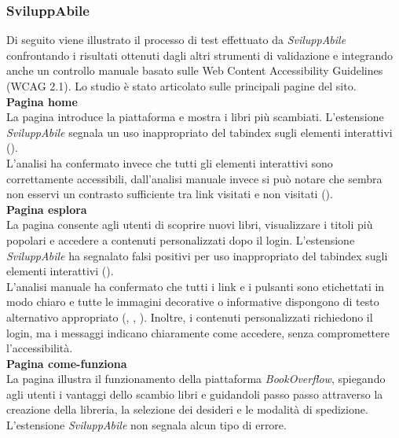 \subsubsection{SviluppAbile}
\noindent Di seguito viene illustrato il processo di test effettuato da \textit{SviluppAbile} confrontando i risultati ottenuti dagli altri strumenti di validazione e integrando anche un controllo manuale basato sulle Web Content Accessibility Guidelines (WCAG 2.1). Lo studio è stato articolato sulle principali pagine del sito.\\

\noindent \textbf{Pagina home}\\
La pagina introduce la piattaforma e mostra i libri più scambiati. 
L’estensione \textit{SviluppAbile} segnala un uso inappropriato del tabindex sugli elementi interattivi ({}).\\
L’analisi ha confermato invece che tutti gli elementi interattivi sono correttamente accessibili, dall'analisi manuale invece si può notare che sembra non esservi un contrasto sufficiente tra link visitati e non visitati ({}).\\

\noindent \textbf{Pagina esplora}\\
La pagina consente agli utenti di scoprire nuovi libri, visualizzare i titoli più popolari e accedere a contenuti personalizzati dopo il login. 
L’estensione \textit{SviluppAbile} ha segnalato falsi positivi per uso inappropriato del tabindex sugli elementi interattivi ({}).\\
L’analisi manuale ha confermato che tutti i link e i pulsanti sono etichettati in modo chiaro e tutte le immagini decorative o informative dispongono di testo alternativo appropriato ({}, {}, {}). Inoltre, i contenuti personalizzati richiedono il login, ma i messaggi indicano chiaramente come accedere, senza compromettere l’accessibilità.\\

\noindent \textbf{Pagina come-funziona}\\
La pagina illustra il funzionamento della piattaforma \textit{BookOverflow}, spiegando agli utenti i vantaggi dello scambio libri e guidandoli passo passo attraverso la creazione della libreria, la selezione dei desideri e le modalità di spedizione. 
L’estensione \textit{SviluppAbile} non segnala alcun tipo di errore.\\

